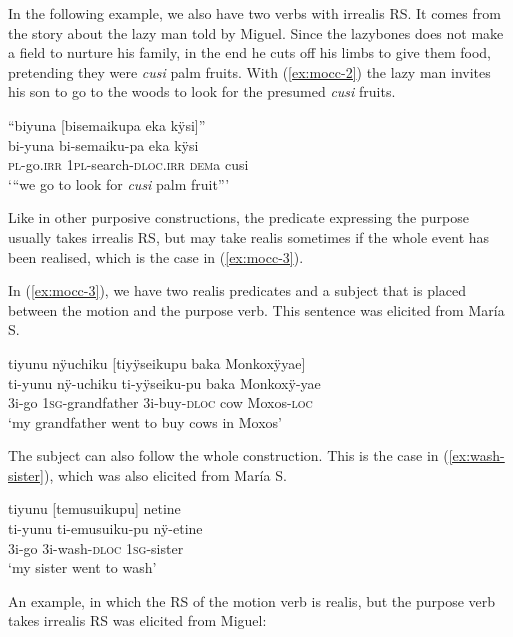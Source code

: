 In the following example, we also have two verbs with irrealis RS. It comes from the story about the lazy man told by Miguel. Since the lazybones does not make a field to nurture his family, in the end he cuts off his limbs to give them food, pretending they were \textit{cusi} palm fruits. With (\ref{ex:mocc-2}) the lazy man invites his son to go to the woods to look for the presumed \textit{cusi} fruits.

\ea\label{ex:mocc-2}
\begingl
\glpreamble “biyuna \textup{[}bisemaikupa eka kÿsi\textup{]}”\\
\gla bi-yuna bi-semaiku-pa eka kÿsi\\
\textsc{pl}-go.\textsc{irr} 1\textsc{pl}-search-\textsc{dloc.irr} \textsc{dem}a cusi\\
\glft ‘“we go to look for \textit{cusi} palm fruit”’
\endgl
\trailingcitation{[mox-n110920l.085]}
\xe


Like in other purposive constructions, the predicate expressing the purpose usually takes irrealis RS, but may take realis sometimes if the whole event has been realised, which is the case in (\ref{ex:mocc-3}).

In (\ref{ex:mocc-3}), we have two realis predicates and a subject that is placed between the motion and the purpose verb. This sentence was elicited from María S.

\ea\label{ex:mocc-3}
\begingl
\glpreamble tiyunu nÿuchiku \textup{[}tiyÿseikupu baka Monkoxÿyae\textup{]}\\
\gla ti-yunu nÿ-uchiku ti-yÿseiku-pu baka Monkoxÿ-yae\\
\glb 3i-go 1\textsc{sg}-grandfather 3i-buy-\textsc{dloc} cow Moxos-\textsc{loc}\\
\glft ‘my grandfather went to buy cows in Moxos’
\endgl
\trailingcitation{[rxx-e181020le]}
\xe

The subject can also follow the whole construction. This is the case in (\ref{ex:wash-sister}), which was also elicited from María S.

\ea\label{ex:wash-sister}
\begingl
\glpreamble tiyunu \textup{[}temusuikupu\textup{]} netine\\
\gla ti-yunu ti-emusuiku-pu nÿ-etine\\
\glb 3i-go 3i-wash-\textsc{dloc} 1\textsc{sg}-sister\\
\glft ‘my sister went to wash’
\endgl
\trailingcitation{[rxx-e181018le-a]}
\xe

An example, in which the RS of the motion verb is realis, but the purpose verb takes irrealis RS was elicited from Miguel:

